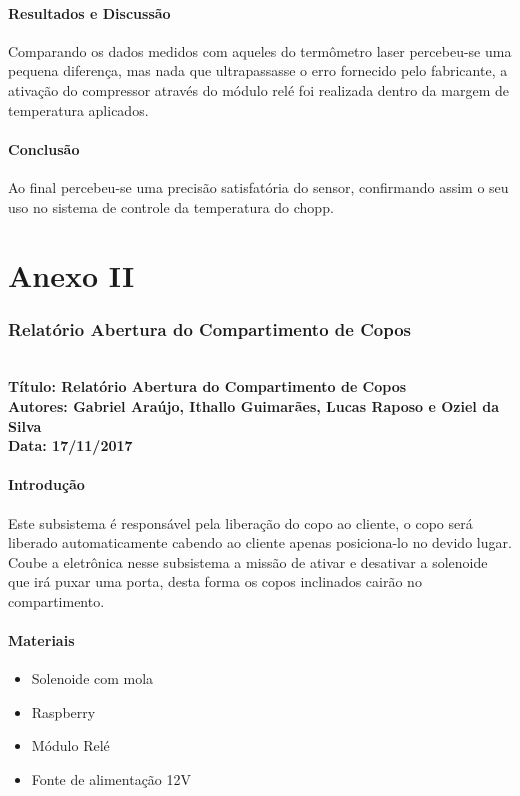\begin{anexosenv}
\subsubsection{Resultados e Discussão}
     Comparando os dados medidos com aqueles do termômetro laser percebeu-se uma pequena diferença, mas nada que ultrapassasse o erro fornecido pelo fabricante, a ativação do compressor através do módulo relé foi realizada dentro da margem de temperatura aplicados.
\subsubsection{Conclusão}
     Ao final percebeu-se uma precisão satisfatória do sensor, confirmando assim o seu uso no sistema de controle da temperatura do chopp.



\chapter{Anexo II}

\subsection{Relatório Abertura do Compartimento de Copos}     
\textbf{ \\
  Título: Relatório Abertura do Compartimento de Copos  \\
    Autores: Gabriel Araújo, Ithallo Guimarães, Lucas Raposo e Oziel da Silva \\
      Data: 17/11/2017} \\



\subsubsection{Introdução}
    Este subsistema é responsável pela liberação do copo ao cliente, o copo será liberado automaticamente cabendo ao cliente apenas posiciona-lo no devido lugar. Coube a eletrônica nesse subsistema a missão de ativar e desativar a solenoide que irá puxar uma porta, desta forma os copos inclinados cairão no compartimento.

\subsubsection{Materiais}
\begin{itemize}
     \item Solenoide com mola
     \item Raspberry
     \item Módulo Relé
     \item Fonte de alimentação 12V    
         

\end{itemize}
\end{anexosenv}
